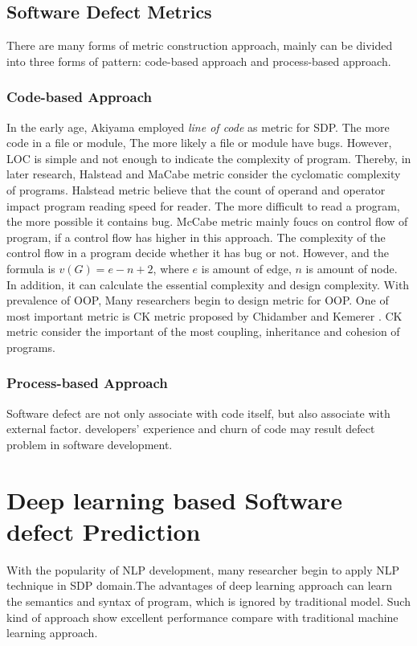 \subsection{Software Defect Metrics}
There are many forms of metric construction approach, mainly can be divided into three forms of pattern: code-based approach and process-based approach.

\subsubsection{Code-based Approach}
In the early age, Akiyama \cite{} employed \textit{line of code} as metric for SDP. The more code in a file or module, The more likely a file or module have bugs. However, LOC is simple and not enough to indicate the complexity of program. Thereby, in later research, Halstead and MaCabe metric consider the cyclomatic complexity of programs. Halstead metric \cite{} believe that the count of  operand and operator impact program reading speed for reader. The more difficult to read a program, the more possible it contains bug. McCabe metric mainly foucs on control flow of program, if a control flow has higher in this approach. The complexity of the control flow in a program decide whether it has bug or not. However, and the formula is $v(G)=e-n+2$, where $e$ is amount of edge, $n$ is amount of node. In addition, it can calculate the essential complexity and design complexity. With prevalence of OOP, Many researchers begin to design metric for OOP. One of most important metric is CK metric proposed by Chidamber and Kemerer \cite{}. CK metric consider the important of the most coupling, inheritance and cohesion of programs. 

\subsubsection{Process-based Approach}
Software defect are not only associate with code itself, but also associate with external factor. developers' experience and churn of code may result defect problem in software development. 


\section{Deep learning based Software defect Prediction}
With the popularity of NLP development, many researcher begin to apply NLP technique in SDP domain.The advantages of deep learning approach can learn the semantics and syntax of program, which is ignored by traditional model. Such kind of approach show excellent performance compare with traditional machine learning approach.\\

